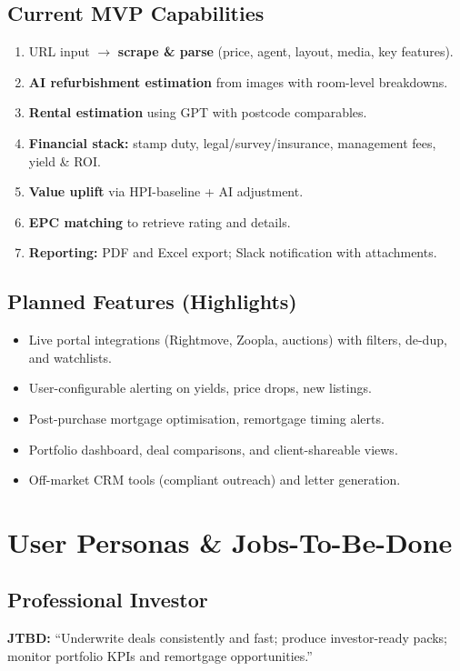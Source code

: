 \documentclass[12pt,a4paper]{article}
\begin{document}
\subsection{Current MVP Capabilities}
\begin{enumerate}[leftmargin=1.5em]
  \item URL input $\rightarrow$ \textbf{scrape \& parse} (price, agent, layout, media, key features).
  \item \textbf{AI refurbishment estimation} from images with room-level breakdowns.
  \item \textbf{Rental estimation} using GPT with postcode comparables.
  \item \textbf{Financial stack:} stamp duty, legal/survey/insurance, management fees, yield \& ROI.
  \item \textbf{Value uplift} via HPI-baseline + AI adjustment.
  \item \textbf{EPC matching} to retrieve rating and details.
  \item \textbf{Reporting:} PDF and Excel export; Slack notification with attachments.
\end{enumerate}

\subsection{Planned Features (Highlights)}
\begin{itemize}[leftmargin=1.5em]
  \item Live portal integrations (Rightmove, Zoopla, auctions) with filters, de-dup, and watchlists.
  \item User-configurable alerting on yields, price drops, new listings.
  \item Post-purchase mortgage optimisation, remortgage timing alerts.
  \item Portfolio dashboard, deal comparisons, and client-shareable views.
  \item Off-market CRM tools (compliant outreach) and letter generation.
\end{itemize}

\section{User Personas \& Jobs-To-Be-Done}
\subsection{Professional Investor}
\textbf{JTBD:} “Underwrite deals consistently and fast; produce investor-ready packs; monitor portfolio KPIs and remortgage opportunities.”
\end{document}
